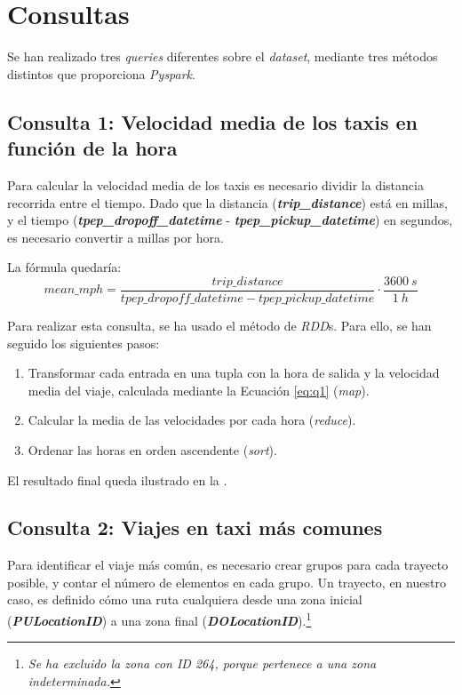 \section{Consultas}
Se han realizado tres \textit{queries} diferentes sobre el \textit{dataset}, mediante tres métodos distintos que proporciona \textit{Pyspark}.


\subsection{Consulta 1: Velocidad media de los taxis en función de la hora}
Para calcular la velocidad media de los taxis es necesario dividir la distancia recorrida entre el tiempo. Dado que la distancia (\textbf{\textit{trip\_distance}}) está en millas, y el tiempo (\textbf{\textit{tpep\_dropoff\_datetime}} - \textbf{\textit{tpep\_pickup\_datetime}}) en segundos, es necesario convertir a millas por hora.

La fórmula quedaría:
\begin{equation}\label{eq:q1}
  mean\_mph = \frac{trip\_distance}{tpep\_dropoff\_datetime - tpep\_pickup\_datetime} \cdot \frac{3600\ s}{1\ h}
\end{equation}


Para realizar esta consulta, se ha usado el método de \textit{RDD}s. Para ello, se han seguido los siguientes pasos:
\begin{enumerate}
  \item Transformar cada entrada en una tupla con la hora de salida y la velocidad media del viaje, calculada mediante la Ecuación \ref{eq:q1} (\textit{map}).
  \item Calcular la media de las velocidades por cada hora (\textit{reduce}).
  \item Ordenar las horas en orden ascendente (\textit{sort}).
\end{enumerate}

\noindent
El resultado final queda ilustrado en la .




\subsection{Consulta 2: Viajes en taxi más comunes}
Para identificar el viaje más común, es necesario crear grupos para cada trayecto posible, y contar el número de elementos en cada grupo.
Un trayecto, en nuestro caso, es definido cómo una ruta cualquiera desde una zona inicial (\textbf{\textit{PULocationID}}) a una zona final (\textbf{\textit{DOLocationID}}).\footnote{\textit{Se ha excluido la zona con ID 264, porque pertenece a una zona indeterminada.}}

